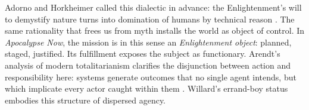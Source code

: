 Adorno and Horkheimer called this dialectic in advance: the Enlightenment’s will to demystify nature turns into domination of humans by technical reason \parencite{AdornoHorkheimer2002}. The same rationality that frees us from myth installs the world as object of control. In \textit{Apocalypse Now}, the mission is in this sense an \emph{Enlightenment object}: planned, staged, justified. Its fulfillment exposes the subject as functionary. Arendt’s analysis of modern totalitarianism clarifies the disjunction between action and responsibility here: systems generate outcomes that no single agent intends, but which implicate every actor caught within them \parencite{ArendtOrigins1973}. Willard’s errand-boy status embodies this structure of dispersed agency.
